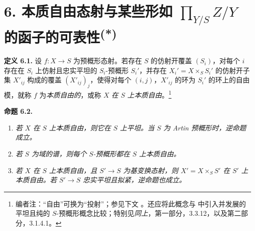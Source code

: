 
\section*{6. 本质自由态射与某些形如 \(\prod_{Y/S}Z/Y\) 的函子的可表性\textsuperscript{(*)}}

\begingroup
\renewcommand{\thefootnote}{(*)}
\endgroup

\noindent{}\textbf{定义 6.1.}
设 \(f:X\to S\) 为预概形态射。若存在 \(S\) 的仿射开覆盖 \((S_i)\)，对每个 \(i\) 存在在 \(S_i\) 上仿射且忠实平坦的 \(S_i\)-预概形 \(S_i'\)，并存在 \(X_i'=X\times_SS_i'\) 的仿射开子集 \(X'_{ij}\) 构成的覆盖 \((X'_{ij})_j\)，使得对每个 \((i,j)\)，\(X'_{ij}\) 的环为 \(S_i'\) 的环上的自由模，就称 \(f\) 为\emph{本质自由的}，或称 \(X\) \emph{在 \(S\) 上本质自由}。\footnote{编者注：“自由”可换为“投射”；参见下文 。还应将此概念与  中引入并发展的平坦且纯的 \(S\)-预概形概念比较；特别见\emph{同上}，第一部分，3.3.12，以及第二部分，3.1.4.1。}

\medskip
\noindent{}\textbf{命题 6.2.}
\begin{enumerate}
  \item[(a)]
  \textit{若 \(X\) 在 \(S\) 上本质自由，则它在 \(S\) 上平坦。当 \(S\) 为 Artin 预概形时，逆命题成立。}

  \item[(b)]
  \textit{若 \(S\) 为域的谱，则每个 \(S\)-预概形都在 \(S\) 上本质自由。}

  \item[(c)]
  \textit{若 \(X\) 在 \(S\) 上本质自由，且 \(S'\to S\) 为基变换态射，则 \(X'=X\times_SS'\) 在 \(S'\) 上本质自由。若 \(S'\to S\) 忠实平坦且拟紧，逆命题也成立。}
\end{enumerate}

